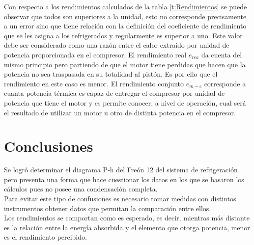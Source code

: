 \documentclass[11pt,letterpaper]{extarticle}        %
\numberwithin{equation}{section}                    %
\begin{document}
Con respecto a los rendimientos calculados de la tabla \ref{t:Rendimientos} se puede observar que todos son superiores a la unidad, esto no corresponde precisamente a un error sino que tiene relación con la definición del coeficiente de rendimiento que se les asigna a los refrigerados y regularmente es superior a uno. Este valor debe ser considerado como una razón entre el calor extraído por unidad de potencia proporcionada en el compresor. El rendimiento real $e_{rea}$ da cuenta del mismo principio pero partiendo de que el motor tiene perdidas que hacen que la potencia no sea traspasada en su totalidad al pistón. Es por ello que el rendimiento en este caso es menor. El rendimiento conjunto $e_{m-c}$ corresponde a cuanta potencia térmica es capaz de entregar el compresor por unidad de potencia que tiene el motor y es permite conocer, a nivel de operación, cual será el resultado de utilizar un motor u otro de distinta potencia en el compresor.



\section{Conclusiones}

Se logró determinar el diagrama P-h del Freón 12 del sistema de refrigeración pero presenta una forma que hace cuestionar los datos en los que se basaron los cálculos pues no posee una condensación completa.\\

Para evitar este tipo de confusiones es necesario tomar medidas con distintos instrumentos obtener datos que permitan la comparación entre ellos.\\

Los rendimientos se comportan como es esperado, es decir, mientras más distante es la relación entre la energía absorbida y el elemento que otorga potencia, menor es el rendimiento percibido.

\newpage
\end{document}
